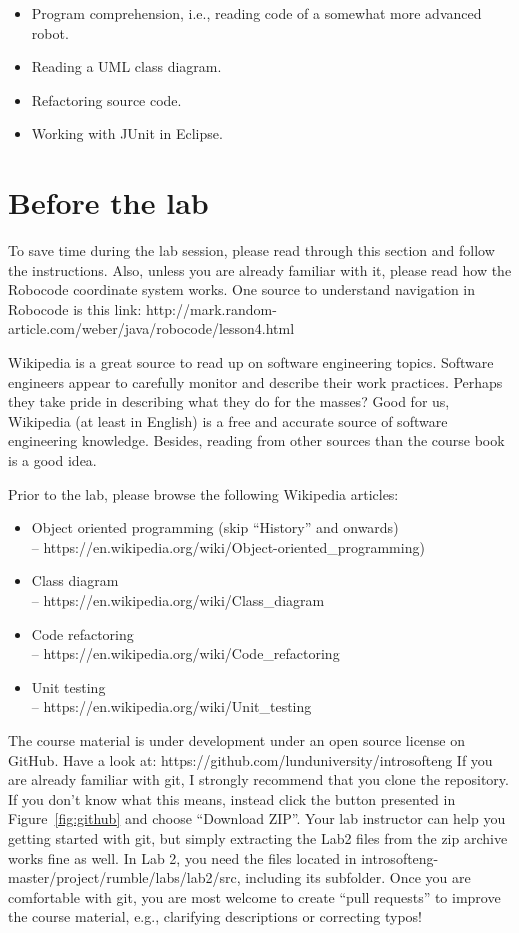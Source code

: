 \documentclass{scrreprt}
\begin{document}
\begin{itemize}
\item Program comprehension, i.e., reading code of a somewhat more advanced robot.
\item Reading a UML class diagram.
\item Refactoring source code.
\item Working with JUnit in Eclipse.
\end{itemize}

\chapter{Before the lab}
To save time during the lab session, please read through this section and follow the instructions. Also, unless you are already familiar with it, please read how the Robocode coordinate system works. One source to understand navigation in Robocode is this link: http://mark.random-article.com/weber/java/robocode/lesson4.html

Wikipedia is a great source to read up on software engineering topics. Software engineers appear to carefully monitor and describe their work practices. Perhaps they take pride in describing what they do for the masses? Good for us, Wikipedia (at least in English) is a free and accurate source of software engineering knowledge. Besides, reading from other sources than the course book is a good idea.

Prior to the lab, please browse the following Wikipedia articles:
\begin{itemize}
\item Object oriented programming (skip ``History'' and onwards)\\-- https://en.wikipedia.org/wiki/Object-oriented_programming)
\item Class diagram\\-- https://en.wikipedia.org/wiki/Class_diagram
\item Code refactoring\\-- https://en.wikipedia.org/wiki/Code_refactoring
\item Unit testing\\-- https://en.wikipedia.org/wiki/Unit_testing
\end{itemize}

The course material is under development under an open source license on GitHub. Have a look at: https://github.com/lunduniversity/introsofteng
If you are already familiar with git, I strongly recommend that you clone the repository. If you don't know what this means, instead click the button presented in Figure~\ref{fig:github} and choose ``Download ZIP''. Your lab instructor can help you getting started with git, but simply extracting the Lab2 files from the zip archive works fine as well. In Lab 2, you need the files located in introsofteng-master/project/rumble/labs/lab2/src, including its subfolder. Once you are comfortable with git, you are most welcome to create ``pull requests'' to improve the course material, e.g., clarifying descriptions or correcting typos!
\end{document}
